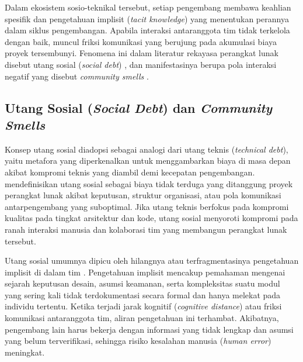 Dalam ekosistem sosio-teknikal tersebut, setiap pengembang membawa keahlian spesifik dan pengetahuan implisit (\textit{tacit knowledge}) yang menentukan perannya dalam siklus pengembangan.
Apabila interaksi antaranggota tim tidak terkelola dengan baik, muncul friksi komunikasi yang berujung pada akumulasi biaya proyek tersembunyi.
Fenomena ini dalam literatur rekayasa perangkat lunak disebut utang sosial (\textit{social debt}) \parencite{tamburri2013social}, dan manifestasinya berupa pola interaksi negatif yang disebut \textit{community smells} \parencite{tamburri2015}.

\subsection{Utang Sosial (\textit{Social Debt}) dan \textit{Community Smells}}
Konsep utang sosial diadopsi sebagai analogi dari utang teknis (\textit{technical debt}), yaitu metafora yang diperkenalkan \textcite{cunningham1992wycash} untuk menggambarkan biaya di masa depan akibat kompromi teknis yang diambil demi kecepatan pengembangan.
\textcite{tamburri2013social} mendefinisikan utang sosial sebagai biaya tidak terduga yang ditanggung proyek perangkat lunak akibat keputusan, struktur organisasi, atau pola komunikasi antarpengembang yang suboptimal.
Jika utang teknis berfokus pada kompromi kualitas pada tingkat arsitektur dan kode, utang sosial menyoroti kompromi pada ranah interaksi manusia dan kolaborasi tim yang membangun perangkat lunak tersebut.

Utang sosial umumnya dipicu oleh hilangnya atau terfragmentasinya pengetahuan implisit di dalam tim \parencite{gote2023locating}.
Pengetahuan implisit mencakup pemahaman mengenai sejarah keputusan desain, asumsi keamanan, serta kompleksitas suatu modul yang sering kali tidak terdokumentasi secara formal dan hanya melekat pada individu tertentu.
Ketika terjadi jarak kognitif (\textit{cognitive distance}) atau friksi komunikasi antaranggota tim, aliran pengetahuan ini terhambat.
Akibatnya, pengembang lain harus bekerja dengan informasi yang tidak lengkap dan asumsi yang belum terverifikasi, sehingga risiko kesalahan manusia (\textit{human error}) meningkat.

